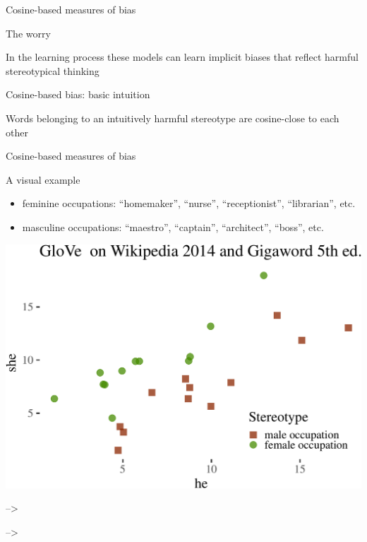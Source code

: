 \documentclass[10pt,ignorenonframetext,x11names, dvipsnames, bibspacing,natbib]{beamer}
\begin{document}
\begin{frame}{Cosine-based measures of bias}

\begin{block}{The worry}

In the learning process these models can learn implicit biases that
reflect harmful stereotypical thinking

\pause

\end{block}

\begin{block}{Cosine-based bias: basic intuition}

Words belonging to an intuitively harmful stereotype are cosine-close to
each other

\end{block}

\end{frame}

\begin{frame}{Cosine-based measures of bias}

\begin{block}{A visual example}

\footnotesize 

\begin{itemize}
\item
  feminine occupations: ``homemaker'', ``nurse'', ``receptionist'',
  ``librarian'', etc.
\item
  masculine occupations: ``maestro'', ``captain'', ``architect'',
  ``boss'', etc.
\end{itemize}

\normalsize 

\vspace{1mm} \footnotesize

\begin{center}\includegraphics[width=0.6\linewidth]{presentationESSLLI_files/figure-beamer/unnamed-chunk-1-1} \end{center}

\normalsize

--\textgreater{}

--\textgreater{}

\end{block}

\end{frame}
\end{document}
